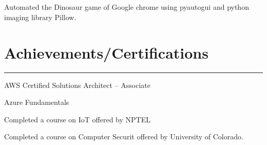\documentclass[]{rahulworld-resume}
\begin{document}
\begin{minipage}[t]{0.57\textwidth}
\datecolor{}  
\noindent
\hspace{5em}%
\begin{minipage}{1\textwidth\vspace{2pt}}
\runsubsection{[Python]}\\\\
Automated the Dinosaur game of Google chrome using pyautogui and python imaging library Pillow.
\end{minipage}
\section{Achievements/Certifications} 
\noindent\rule{11cm}{0.4pt}
 
\noindent
\hspace{5em}%
\begin{minipage}{0.85\textwidth\vspace{2pt}}
 AWS Certified Solutions Architect – Associate
\end{minipage}
 
\noindent
\hspace{5em}%
\begin{minipage}{0.85\textwidth\vspace{2pt}}
\runsubsection{}
 Azure Fundamentals
\end{minipage}
 
\noindent
\hspace{5em}%
\begin{minipage}{0.85\textwidth\vspace{2pt}}
Completed a course on IoT offered by NPTEL
\end{minipage}
 
\noindent
\hspace{5em}%
\begin{minipage}{0.85\textwidth\vspace{2pt}}
Completed a course on Computer Securit offered by University of Colorado.
\end{minipage}

\end{minipage}
\end{document}
